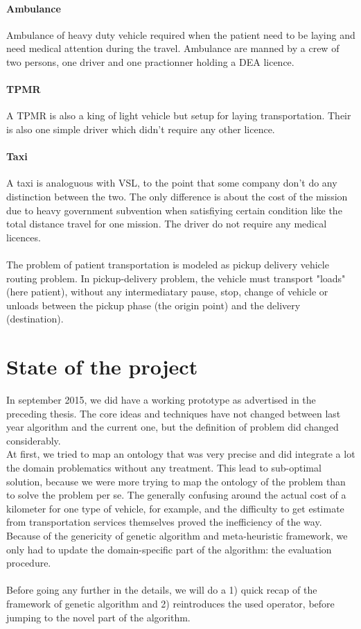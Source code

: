\documentclass[12pt]{memoir}
\begin{document}
\paragraph{Ambulance} %
\label{par:Ambulance}
Ambulance of heavy duty vehicle required when the patient need to be laying and need
medical attention during the travel. Ambulance are manned by a crew of two persons,
one driver and one practionner holding a DEA licence.

  \paragraph{TPMR} %
\label{par:TPMR}
A TPMR is also a king of light vehicle but setup for laying transportation. Their is
also one simple driver which didn't require any other licence. 

  \paragraph{Taxi} %
\label{par:Taxi}
A taxi is analoguous with VSL, to the point that some company don't do any
distinction between the two. The only difference is about the cost of the mission
due to heavy government subvention when satisfiying certain condition like the total
distance travel for one mission. The driver do not require any medical licences.\\
\\
The problem of patient transportation is modeled as pickup delivery vehicle routing
problem. In pickup-delivery problem, the vehicle must transport "loads" (here
patient), without any intermediatary pause, stop, change of vehicle or unloads
between the pickup phase (the origin point) and the delivery (destination).

\section{State of the project}
In september 2015, we did have a working prototype as advertised in the preceding
thesis. The core ideas and techniques have not changed between last year algorithm
and the current one, but the definition of problem did changed considerably. \\
At first, we tried to map an ontology that was very precise and did integrate a lot
the domain problematics without any treatment. This lead to sub-optimal solution,
because we were more trying to map the ontology of the problem than to solve the
problem per se. The generally confusing around the actual cost of a kilometer for
one type of vehicle, for example, and the difficulty to get estimate from transportation services
themselves proved the inefficiency of the way.\\
Because of the genericity of genetic algorithm and meta-heuristic framework, we only
had to update the domain-specific part of the algorithm: the evaluation procedure.\\
\\
Before going any further in the details, we will do a 1) quick recap of the framework
of genetic algorithm and 2) reintroduces the used operator, before jumping to the
novel part of the algorithm.
\end{document}
